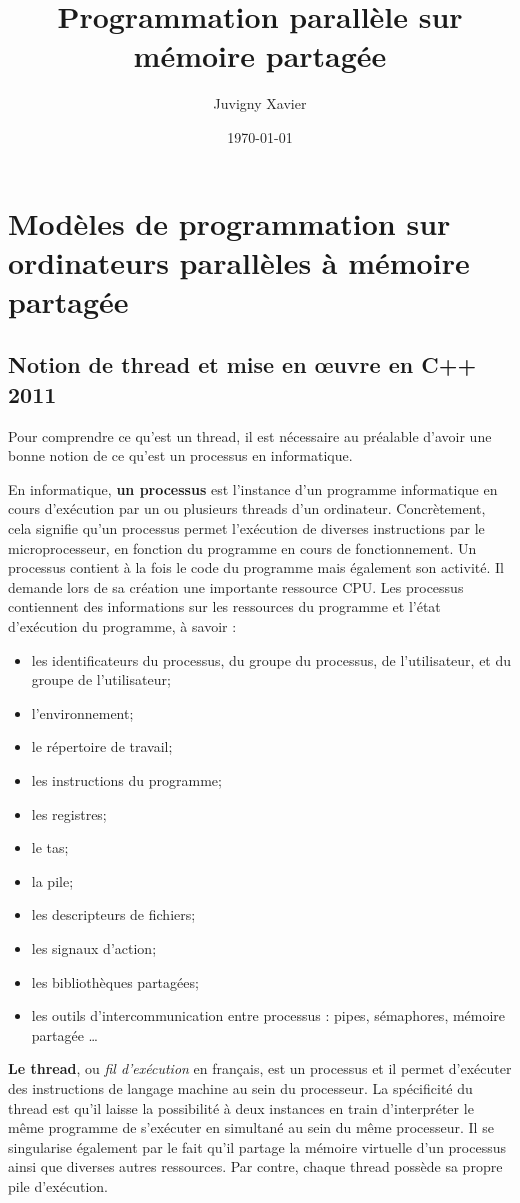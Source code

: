 \documentclass[fleqn,11pt]{article}
\title{Programmation parallèle sur mémoire partagée}
\author{Juvigny Xavier}
\date{\today}
\begin{document}
\maketitle
\tableofcontents

\section{Modèles de programmation sur ordinateurs parallèles à mémoire partagée}

\subsection{Notion de thread et mise en {\oe}uvre en C++ 2011}

Pour comprendre ce qu'est un thread, il est nécessaire au préalable d'avoir une bonne notion de ce
qu'est un processus en informatique.

En informatique, \textbf{un processus} est l’instance d’un programme informatique en cours d’exécution par un ou plusieurs threads d’un ordinateur. Concrètement, cela signifie qu’un processus permet l’exécution de diverses instructions par le microprocesseur, en fonction du programme en cours de fonctionnement. Un processus contient à la fois le code du programme mais également son activité. Il demande lors de sa création une
importante ressource CPU. Les processus contiennent des informations sur les ressources
du programme et l'état d'exécution du programme, à savoir :
\begin{itemize}
 \item les identificateurs du processus, du groupe du processus, de l'utilisateur, et du groupe de l'utilisateur;
 \item l'environnement;
 \item le répertoire de travail;
 \item les instructions du programme;
 \item les registres;
 \item le tas;
 \item la pile;
 \item les descripteurs de fichiers;
 \item les signaux d'action;
 \item les bibliothèques partagées;
 \item les outils d'intercommunication entre processus : pipes, sémaphores, mémoire partagée \ldots
\end{itemize}

\textbf{Le thread}, ou \textsl{fil d’exécution} en français, est un  processus et il permet d’exécuter des instructions de langage machine au sein du processeur. La spécificité du thread est qu’il laisse la possibilité à deux instances en train d’interpréter le même programme de s’exécuter en simultané au sein du même processeur. Il se singularise également par le fait qu'il partage la mémoire virtuelle d'un processus ainsi que diverses autres ressources. Par contre, chaque thread possède sa propre pile d'exécution.
\end{document}
